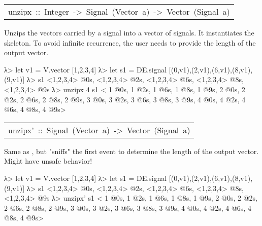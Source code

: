 \begin{haddockdesc}
\item[\begin{tabular}{@{}l}
unzipx\ ::\ Integer\ ->\ Signal\ (Vector\ a)\ ->\ Vector\ (Signal\ a)
\end{tabular}]\haddockbegindoc
Unzips the vectors carried by a signal into a vector of
 signals. It instantiates the 
 skeleton. To avoid infinite recurrence, the user needs to provide
 the length of the output vector.\par
\begin{interactive}
λ> let v1 = V.vector [1,2,3,4]
λ> let s1 = DE.signal [(0,v1),(2,v1),(6,v1),(8,v1),(9,v1)]
λ> s1
{ <1,2,3,4> @0s, <1,2,3,4> @2s, <1,2,3,4> @6s, <1,2,3,4> @8s, <1,2,3,4> @9s}
λ> unzipx 4 s1
<{ 1 @0s, 1 @2s, 1 @6s, 1 @8s, 1 @9s},{ 2 @0s, 2 @2s, 2 @6s, 2 @8s, 2 @9s},{ 3 @0s, 3 @2s, 3 @6s, 3 @8s, 3 @9s},{ 4 @0s, 4 @2s, 4 @6s, 4 @8s, 4 @9s}>

\end{interactive}\par
           

\item[\begin{tabular}{@{}l}
unzipx'\ ::\ Signal\ (Vector\ a)\ ->\ Vector\ (Signal\ a)
\end{tabular}]\haddockbegindoc
Same as , but "sniffs" the first event to determine the length of the output vector. Might have unsafe behavior!\par
\begin{interactive}
λ> let v1 = V.vector [1,2,3,4]
λ> let s1 = DE.signal [(0,v1),(2,v1),(6,v1),(8,v1),(9,v1)]
λ> s1
{ <1,2,3,4> @0s, <1,2,3,4> @2s, <1,2,3,4> @6s, <1,2,3,4> @8s, <1,2,3,4> @9s}
λ> unzipx' s1
<{ 1 @0s, 1 @2s, 1 @6s, 1 @8s, 1 @9s},{ 2 @0s, 2 @2s, 2 @6s, 2 @8s, 2 @9s},{ 3 @0s, 3 @2s, 3 @6s, 3 @8s, 3 @9s},{ 4 @0s, 4 @2s, 4 @6s, 4 @8s, 4 @9s}>

\end{interactive}
\end{haddockdesc}
